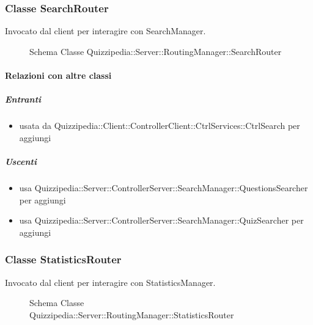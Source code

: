 \subsubsection{Classe SearchRouter}
Invocato dal client per interagire con SearchManager.
\begin{figure}[H]
\centering
\noindent{}
\caption[Schema Classe SearchRouter]{Schema Classe Quizzipedia::Server::RoutingManager::SearchRouter}
\end{figure}
\paragraph{Relazioni con altre classi}
\subparagraph{Entranti}
\begin{itemize}
\item usata da Quizzipedia::Client::ControllerClient::CtrlServices::CtrlSearch per aggiungi
\end{itemize}
\subparagraph{Uscenti}
\begin{itemize}
\item usa Quizzipedia::Server::ControllerServer::SearchManager::QuestionsSearcher per aggiungi
\item usa Quizzipedia::Server::ControllerServer::SearchManager::QuizSearcher per aggiungi
\end{itemize}
\subsubsection{Classe StatisticsRouter}
Invocato dal client per interagire con StatisticsManager.
\begin{figure}[H]
\centering
\noindent{}
\caption[Schema Classe StatisticsRouter]{Schema Classe Quizzipedia::Server::RoutingManager::StatisticsRouter}
\end{figure}
